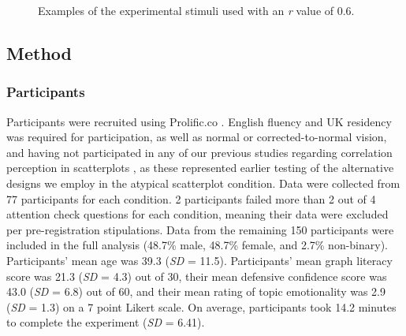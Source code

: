 \documentclass[manuscript,screen,review]{acmart}
\begin{document}
\begin{figure}


\caption{\label{fig-example-plots}Examples of the experimental stimuli
used with an \textit{r} value of 0.6.}

\end{figure}%

\subsection{Method}\label{method}

\subsubsection{Participants}\label{participants}

Participants were recruited using Prolific.co \citep{prolific}. English
fluency and UK residency was required for participation, as well as
normal or corrected-to-normal vision, and having not participated in any
of our previous studies regarding correlation perception in scatterplots
\citep{strain}, as these represented earlier testing of the alternative
designs we employ in the atypical scatterplot condition. Data were
collected from 77 participants for each condition. 2 participants failed
more than 2 out of 4 attention check questions for each condition,
meaning their data were excluded per pre-registration stipulations. Data
from the remaining 150 participants were included in the full analysis
(48.7\% male, 48.7\% female, and 2.7\% non-binary). Participants' mean
age was 39.3 (\emph{SD} = 11.5). Participants' mean graph literacy score
was 21.3 (\emph{SD} = 4.3) out of 30, their mean defensive confidence
score was 43.0 (\emph{SD} = 6.8) out of 60, and their mean rating of
topic emotionality was 2.9 (\emph{SD} = 1.3) on a 7 point Likert scale.
On average, participants took 14.2 minutes to complete the experiment
(\emph{SD} = 6.41).
\end{document}
